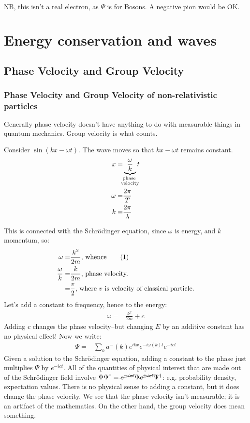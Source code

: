 \documentclass[]{article}
\newcommand\numberthis{\addtocounter{equation}{1}\tag{\theequation}}
\newcommand{\Schr}{{Schr\"odinger }}
\begin{document}
NB, this isn't a real electron, as $\Psi$ is for Bosons. A negative pion would be OK.


\section{Energy conservation and waves}\label{sec:energy:conservation}

\subsection{Phase Velocity and Group Velocity}\label{section:phase:group:velocities}

\subsubsection{Phase Velocity and Group Velocity of non-relativistic particles}
Generally phase velocity doesn't have anything to do with measurable things in quantum mechanics. Group velocity is what counts.

Consider $\sin(kx-\omega t)$. The wave moves so that $kx-\omega t$ remains constant.
\begin{align*}
	x =& \underbrace{\frac{\omega}{k}}_{\mathclap{\substack{\text{phase }\\
															\text{velocity}}}} t\\
	\omega =& \frac{2 \pi}{T}\\
	k =& \frac{2 \pi}{\lambda}
\end{align*}

This is connected with the \Schr equation, since $\omega$ is energy, and $k$ momentum, so:
\begin{align*}
	\omega=&\frac{k^2}{2m} \text{, whence} \numberthis \label{fig:phase:c}\\
	\frac{\omega}{k}=&\frac{k}{2m} \text{, phase velocity.}\\
	=& \frac{v}{2}  \text{, where $v$ is velocity of classical particle.}
\end{align*}
 Let's add a constant to frequency, hence to the energy:
\begin{align*}
	\omega=&\frac{k^2}{2m}+c 
\end{align*}
Adding $c$ changes the phase velocity--but changing $E$ by an additive constant has no physical effect! Now we write:
\begin{align*}
	\Psi =& \sum_k a^-(k) e^{ikx}e^{- i \omega(k) t} e^{-i c t}
\end{align*}
Given a solution to the \Schr equation, adding a constant to the phase just multiplies $\Psi$ by $e^{-i c t}$. All of the quantities of physical interest that are made out of the \Schr field involve $\Psi\Psi^\dagger=\cancel{e^{-i c t}}\Psi \cancel{e^{+i c t}}\Psi^\dagger$: e.g. probability density, expectation values. There is no physical sense to adding a constant, but it does change the phase velocity. We see that the phase velocity isn't measurable; it is an artifact of the mathematics. On the other hand, the group velocity does mean something.
\end{document}
